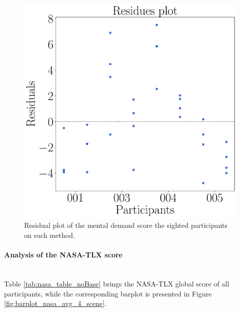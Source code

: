 \begin{figure}[!htb]
\begin{minipage}{0.075\textwidth}
        \hfill
    \end{minipage}
    \begin{minipage}{0.45\textwidth}
        \centering
        \includegraphics[width = \textwidth]{Resultados/Nasa/Figuras/pdf/residplot_md_avg_two_way_sight.pdf}
        \caption{Residual plot of the mental demand score the sighted participants on each method.}
        \label{fig:residplot_md_avg_two_way_sight}
    \end{minipage}
\end{figure}

\FloatBarrier



\paragraph{Analysis of the NASA-TLX score}\mbox{}\\

Table \ref{tab:nasa_table_noBase} brings the NASA-TLX global score of all participants, while the corresponding barplot is presented in Figure \ref{fig:barplot_nasa_avg_4_scene}.

